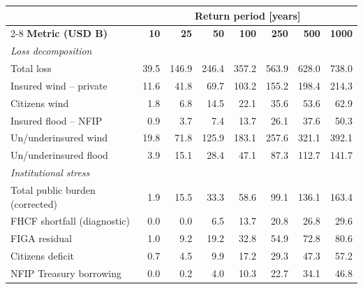 \documentclass[fleqn,10pt]{wlscirep}
\begin{document}
\begin{table}
\begin{tabular}{lrrrrrrr}
\toprule
& \multicolumn{7}{c}{\textbf{Return period [years]}} \\
\cmidrule(l){2-8}
\textbf{Metric (USD B)} &
\textbf{10} &
\textbf{25} &
\textbf{50} &
\textbf{100} &
\textbf{250} &
\textbf{500} &
\textbf{1000} \\
\midrule
\multicolumn{8}{l}{\textit{Loss decomposition}} \\
Total loss                     & 39.5 & 146.9 & 246.4 & 357.2 & 563.9 & 628.0 & 738.0 \\
Insured wind -- private        & 11.6 & 41.8 & 69.7 & 103.2 & 155.2 & 198.4 & 214.3 \\
Citizens wind                  & 1.8 & 6.8 & 14.5 & 22.1 & 35.6 & 53.6 & 62.9 \\
Insured flood -- NFIP          & 0.9 & 3.7 & 7.4 & 13.7 & 26.1 & 37.6 & 50.3 \\
Un/underinsured wind           & 19.8 & 71.8 & 125.9 & 183.1 & 257.6 & 321.1 & 392.1 \\
Un/underinsured flood          & 3.9 & 15.1 & 28.4 & 47.1 & 87.3 & 112.7 & 141.7 \\
\midrule
\multicolumn{8}{l}{\textit{Institutional stress}} \\
Total public burden (corrected)& 1.9 & 15.5 & 33.3 & 58.6 & 99.1 & 136.1 & 163.4 \\
FHCF shortfall (diagnostic)    & 0.0 & 0.0 & 6.5 & 13.7 & 20.8 & 26.8 & 29.6 \\
FIGA residual                  & 1.0 & 9.2 & 19.2 & 32.8 & 54.9 & 72.8 & 80.6 \\
Citizens deficit               & 0.7 & 4.5 & 9.9 & 17.2 & 29.3 & 47.3 & 57.2 \\
NFIP Treasury borrowing        & 0.0 & 0.2 & 4.0 & 10.3 & 22.7 & 34.1 & 46.8 \\
\bottomrule
\end{tabular}
\end{table}
\end{document}
